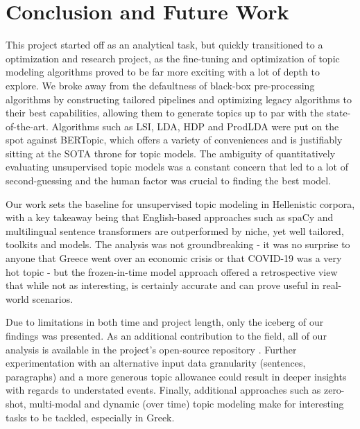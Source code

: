 \section{Conclusion and Future Work}
\label{sec:Conclusion}
This project started off as an analytical task, but quickly transitioned to a optimization and research project, as the fine-tuning and optimization of topic modeling algorithms proved to be far more exciting with a lot of depth to explore. We broke away from the defaultness of black-box pre-processing algorithms by constructing tailored pipelines and optimizing legacy algorithms to their best capabilities, allowing them to generate topics up to par with the state-of-the-art. Algorithms such as LSI, LDA, HDP and ProdLDA were put on the spot against BERTopic, which offers a variety of conveniences and is justifiably sitting at the SOTA throne for topic models. The ambiguity of quantitatively evaluating unsupervised topic models was a constant concern that led to a lot of second-guessing and the human factor was crucial to finding the best model.

Our work sets the baseline for unsupervised topic modeling in Hellenistic corpora, with a key takeaway being that English-based approaches such as spaCy and multilingual sentence transformers are outperformed by niche, yet well tailored, toolkits and models. The analysis was not groundbreaking - it was no surprise to anyone that Greece went over an economic crisis or that COVID-19 was a very hot topic - but the frozen-in-time model approach offered a retrospective view that while not as interesting, is certainly accurate and can prove useful in real-world scenarios.

Due to limitations in both time and project length, only the iceberg of our findings was presented. As an additional contribution to the field, all of our analysis is available in the project's open-source repository \citep{Rigatos;Giannakopoulos:24}. Further experimentation with an alternative input data granularity (sentences, paragraphs) and a more generous topic allowance could result in deeper insights with regards to understated events. Finally, additional approaches such as zero-shot, multi-modal and dynamic (over time) topic modeling make for interesting tasks to be tackled, especially in Greek.